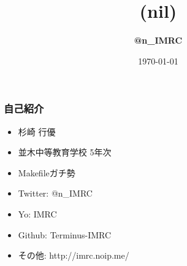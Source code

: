 \documentclass[dvipdfmx,20pt,notheorems,t]{beamer}
\title[(nil)]{(nil)}
\author[@n\_IMRC]{\textbf{@n\_IMRC}}
\institute[Namiki Secondary School]{並木中等教育学校}
\date{\today}
\begin{document}
\begin{frame}[plain]\frametitle{}
\titlepage
\end{frame}

\begin{frame}\frametitle{自己紹介}
\begin{itemize}
\item 杉崎 行優
\item 並木中等教育学校 5年次
\item Makefileガチ勢
\item Twitter: @n\_IMRC
\item Yo: IMRC
\item Github: Terminus-IMRC
\item その他: http://imrc.noip.me/
\end{itemize}
\end{frame}
\end{document}
